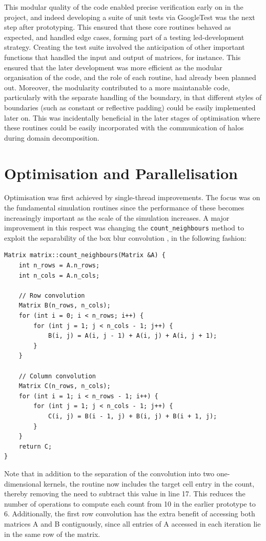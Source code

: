 \documentclass[12pt]{article}
\begin{document}
This modular quality of the code enabled precise verification early on in the project,
and indeed developing a suite of unit tests via GoogleTest was the next step after prototyping.
This ensured that these core routines behaved as expected, and handled edge cases, forming part of a testing led-development strategy.
Creating the test suite involved the anticipation of other important functions that handled the input and output of matrices, for instance.
This ensured that the later development was more efficient as the modular organisation of the code, and the role of each routine, had already been planned out.
Moreover, the modularity contributed to a more maintanable code, particularly with the separate handling of the boundary,
in that different styles of boundaries (such as constant or reflective padding) could be easily implemented later on.
This was incidentally beneficial in the later stages of optimisation where these routines could be easily incorporated with the communication of halos during domain decomposition.

\section*{Optimisation and Parallelisation}

Optimisation was first achieved by single-thread improvements.
The focus was on the fundamental simulation routines since the performance of these becomes increasingly important as the scale of the simulation increases.
A major improvement in this respect was changing the \texttt{count\_neighbours} method to exploit the separability of the box blur convolution \cite{sepfilter},
in the following fashion:

\begin{lstlisting}
Matrix matrix::count_neighbours(Matrix &A) {
    int n_rows = A.n_rows;
    int n_cols = A.n_cols;

    // Row convolution
    Matrix B(n_rows, n_cols);
    for (int i = 0; i < n_rows; i++) {
        for (int j = 1; j < n_cols - 1; j++) {
            B(i, j) = A(i, j - 1) + A(i, j) + A(i, j + 1);
        }
    }

    // Column convolution
    Matrix C(n_rows, n_cols);
    for (int i = 1; i < n_rows - 1; i++) {
        for (int j = 1; j < n_cols - 1; j++) {
            C(i, j) = B(i - 1, j) + B(i, j) + B(i + 1, j);
        }
    }
    return C;
}
\end{lstlisting}

Note that in addition to the separation of the convolution into two one-dimensional kernels, the routine now includes the target cell entry in the count,
thereby removing the need to subtract this value in line 17.
This reduces the number of operations to compute each count from 10 in the earlier prototype to 6.
Additionally, the first row convolution has the extra benefit of accessing both matrices A and B contiguously,
since all entries of A accessed in each iteration lie in the same row of the matrix.
\end{document}
